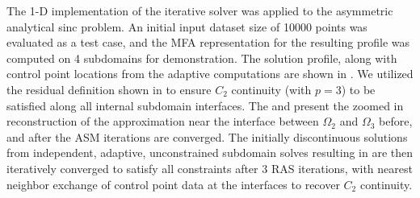 The 1-D implementation of the iterative solver was applied to the asymmetric analytical sinc problem. An initial input dataset size of 10000 points was evaluated as a test case, and the MFA representation for the resulting profile was computed on 4 subdomains for demonstration. The solution profile, along with control point locations from the adaptive computations are shown in . We utilized the residual definition shown in  to ensure $C_2$ continuity (with $p=3$) to be satisfied along all internal subdomain interfaces. The  and  present the zoomed in reconstruction of the approximation near the interface between $\Omega_2$ and $\Omega_3$ before, and after the ASM iterations are converged. The initially discontinuous solutions from independent, adaptive, unconstrained subdomain solves resulting in  are then iteratively converged to satisfy all constraints after 3 RAS iterations, with nearest neighbor exchange of control point data at the interfaces to recover $C_2$ continuity.

